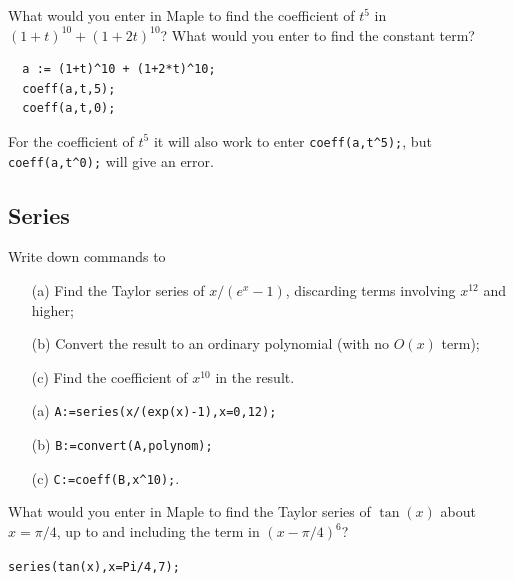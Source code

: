 \documentclass[a4paper]{article}
\begin{document}
\begin{problem}\label{ex-coeff-i}
 What would you enter in Maple to find the coefficient of
 $t^5$ in $(1+t)^{10}+(1+2t)^{10}$?  What would
 you enter to find the constant term?  
\end{problem}
\begin{solution}
\begin{verbatim}
  a := (1+t)^10 + (1+2*t)^10;
  coeff(a,t,5);
  coeff(a,t,0);
\end{verbatim}
 For the coefficient of $t^5$ it will also work to enter
 \verb~coeff(a,t^5);~, but \verb~coeff(a,t^0);~ will give an
 error.  
\end{solution}

\subsection{Series}

\begin{problem}
 Write down commands to
 \begin{itemize}
  \item[(a)] Find the Taylor series of $x/(e^x-1)$, 
   discarding terms involving $x^{12}$ and higher; 
  \item[(b)] Convert the result to an ordinary polynomial
   (with no $O(x)$ term); 
  \item[(c)] Find the coefficient of $x^{10}$ in the
   result.  
 \end{itemize}
\end{problem}
\begin{solution}
 \begin{itemize}
  \item[(a)] \verb~A:=series(x/(exp(x)-1),x=0,12);~  
  \item[(b)] \verb~B:=convert(A,polynom);~ 
  \item[(c)] \verb~C:=coeff(B,x^10);~.  \mk
 \end{itemize}
\end{solution}

\begin{problem}\label{ex-taylor}
 What would you enter in Maple to find the Taylor series of
 $\tan(x)$ about $x=\pi/4$, up to and including the term in
 $(x-\pi/4)^6$? 
\end{problem}
\begin{solution}
 \verb~series(tan(x),x=Pi/4,7);~ 
\end{solution}
\end{document}
